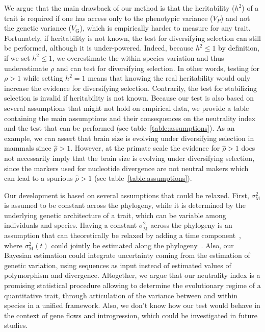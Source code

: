 \documentclass{article}
\newcommand{\Trait}{P}
\newcommand{\Heritability}{h^2}
\newcommand{\VarPhenotype}{V_{\Trait}}
\newcommand{\VarGenetic}{V_{\mathrm{G}}}
\newcommand{\RateMut}{\sigma^2_{\mathrm{M}}}
\newcommand{\NI}{\rho}
\newcommand{\EstNI}{\widehat{\rho}}
\begin{document}
We argue that the main drawback of our method is that the heritability ($\Heritability$) of a trait is required if one has access only to the phenotypic variance ($\VarPhenotype$) and not the genetic variance ($\VarGenetic$), which is empirically harder to measure for any trait.
Fortunately, if heritability is not known, the test for diversifying selection can still be performed, although it is under-powered.
Indeed, because $\Heritability \leq 1$ by definition, if we set $\Heritability \leq 1$, we overestimate the within species variation and thus underestimate $ \NI$ and can test for diversifying selection.
In other words, testing for $\NI > 1$ while setting $\Heritability = 1$ means that knowing the real heritability would only increase the evidence for diversifying selection.
Contrarily, the test for stabilizing selection is invalid if heritability is not known.
Because our test is also based on several assumptions that might not hold on empirical data, we provide a table containing the main assumptions and their consequences on the neutrality index and the test that can be performed (see table~\ref{table:assumptions}).
As an example, we can assert that brain size is evolving under diversifying selection in mammals since $\EstNI > 1$.
However, at the primate scale the evidence for $\EstNI > 1$ does not necessarily imply that the brain size is evolving under diversifying selection, since the markers used for nucleotide divergence are not neutral makers which can lead to a spurious $\EstNI > 1$ (see table~\ref{table:assumptions}).

Our development is based on several assumptions that could be relaxed.
First, $\RateMut$ is assumed to be constant across the phylogeny, while it is determined by the underlying genetic architecture of a trait, which can be variable among individuals and species.
Having a constant $\RateMut$ across the phylogeny is an assumption that can theoretically be relaxed by adding a time component~\cite{arnold_understanding_2008, hohenlohe_mipod_2008}, where $\RateMut(t)$ could jointly be estimated along the phylogeny~\cite{kostikova_bridging_2016, gaboriau_multiplatform_2020}.
Also, our Bayesian estimation could integrate uncertainty coming from the estimation of genetic variation, using sequences as input instead of estimated values of polymorphism and divergence.
Altogether, we argue that our neutrality index is a promising statistical procedure allowing to determine the evolutionary regime of a quantitative trait, through articulation of the variance between and within species in a unified framework.
Also, we don't know how our test would behave in the context of gene flows and introgression, which could be investigated in future studies.
\end{document}
